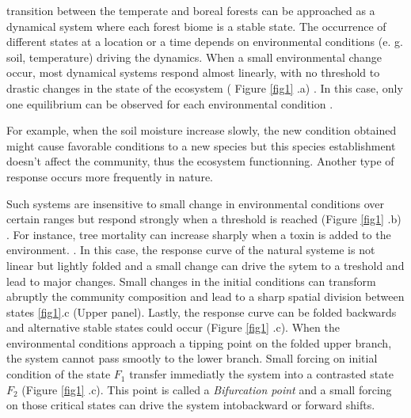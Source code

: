 
transition between  the temperate and boreal forests can be approached as a
dynamical system where each forest biome is a stable state. The occurrence of
different states at a location or a time depends on environmental conditions
(e. g. soil, temperature) driving the dynamics. When a small environmental
change occur, most dynamical systems respond almost linearly, with no
threshold to drastic changes in the state of the ecosystem ( Figure \ref{fig1}
.a) \cite{Scheffer2001,Scheffer2009}. In this case, only one equilibrium can
be observed for each environmental condition
\cite{Scheffer2001,Scheffer2009,scheffer2009critical}.


For example, when the soil moisture increase slowly, the new condition
obtained might cause favorable conditions to a new species but this species
establishment doesn't affect the community, thus the ecosystem functionning.
Another type of response occurs more frequently in nature.


Such systems are insensitive to small change in environmental conditions over
certain ranges but respond strongly when a threshold is reached (Figure
\ref{fig1} .b) \cite{scheffer2009critical}. For instance, tree mortality can
increase sharply when a toxin is added to the environment.
\cite{scheffer2009critical}. In this case, the response curve of the natural
systeme is not linear but lightly folded and a small change can drive the
sytem to a treshold and lead to major changes. Small changes in the initial
conditions can transform abruptly the community composition and lead to a
sharp spatial division between states \ref{fig1}.c (Upper panel). Lastly, the
response curve can be folded backwards and alternative stable states could
occur (Figure \ref{fig1} .c).  When the environmental conditions approach a
tipping point on the folded upper branch, the system cannot pass smootly to
the lower branch. Small forcing on initial condition of the state $F_1$
transfer immediatly the system into a contrasted state $F_2$ (Figure
\ref{fig1} .c). This point is called a \textit{Bifurcation point} and a small
forcing on those critical states can drive the system intobackward or forward
shifts.

